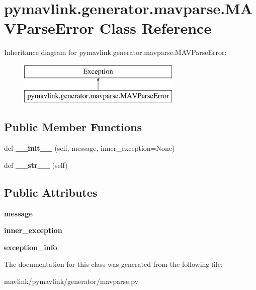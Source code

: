 \hypertarget{classpymavlink_1_1generator_1_1mavparse_1_1MAVParseError}{}\section{pymavlink.\+generator.\+mavparse.\+M\+A\+V\+Parse\+Error Class Reference}
\label{classpymavlink_1_1generator_1_1mavparse_1_1MAVParseError}
Inheritance diagram for pymavlink.\+generator.\+mavparse.\+M\+A\+V\+Parse\+Error\+:\begin{figure}[H]
\begin{center}
\leavevmode
\includegraphics[height=2.000000cm]{classpymavlink_1_1generator_1_1mavparse_1_1MAVParseError}
\end{center}
\end{figure}
\subsection*{Public Member Functions}
\begin{DoxyCompactItemize}
\item 
\mbox{\label{classpymavlink_1_1generator_1_1mavparse_1_1MAVParseError_aa1e76d16c6c42f278bc0373374c4f90e}} 
def {\bfseries \+\_\+\+\_\+init\+\_\+\+\_\+} (self, message, inner\+\_\+exception=None)
\item 
\mbox{\label{classpymavlink_1_1generator_1_1mavparse_1_1MAVParseError_a92f1e0272ecee341be18ab9abc3e46e0}} 
def {\bfseries \+\_\+\+\_\+str\+\_\+\+\_\+} (self)
\end{DoxyCompactItemize}
\subsection*{Public Attributes}
\begin{DoxyCompactItemize}
\item 
\mbox{\label{classpymavlink_1_1generator_1_1mavparse_1_1MAVParseError_ac5a23274e71dc24aebf5413e980a6eb0}} 
{\bfseries message}
\item 
\mbox{\label{classpymavlink_1_1generator_1_1mavparse_1_1MAVParseError_acfcccef17615294c4f1a48b9dbcb2e33}} 
{\bfseries inner\+\_\+exception}
\item 
\mbox{\label{classpymavlink_1_1generator_1_1mavparse_1_1MAVParseError_a6a6d8da831e20b764aa2b383489f561d}} 
{\bfseries exception\+\_\+info}
\end{DoxyCompactItemize}


The documentation for this class was generated from the following file\+:\begin{DoxyCompactItemize}
\item 
mavlink/pymavlink/generator/mavparse.\+py\end{DoxyCompactItemize}
